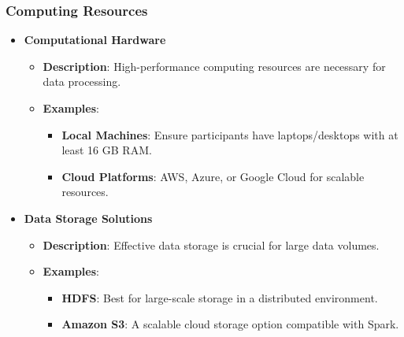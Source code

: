 \documentclass[aspectratio=169]{beamer}
\begin{document}
\begin{frame}[fragile]
    \frametitle{Computing Resources}
    \begin{itemize}
        \item \textbf{Computational Hardware}
        \begin{itemize}
            \item \textbf{Description}: High-performance computing resources are necessary for data processing.
            \item \textbf{Examples}:
            \begin{itemize}
                \item \textbf{Local Machines}: Ensure participants have laptops/desktops with at least 16 GB RAM.
                \item \textbf{Cloud Platforms}: AWS, Azure, or Google Cloud for scalable resources.
            \end{itemize}
        \end{itemize}

        \item \textbf{Data Storage Solutions}
        \begin{itemize}
            \item \textbf{Description}: Effective data storage is crucial for large data volumes.
            \item \textbf{Examples}:
            \begin{itemize}
                \item \textbf{HDFS}: Best for large-scale storage in a distributed environment.
                \item \textbf{Amazon S3}: A scalable cloud storage option compatible with Spark.
            \end{itemize}
        \end{itemize}
    \end{itemize}
\end{frame}
\end{document}
